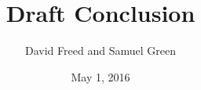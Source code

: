 \documentclass[12pt]{article}
\begin{document}
\setcounter{page}{1}
\begin{doublespacing}

\title{Draft Conclusion}
\author{David Freed and Samuel Green}
\date{May 1, 2016}
\maketitle


\end{doublespacing}
\end{document}
